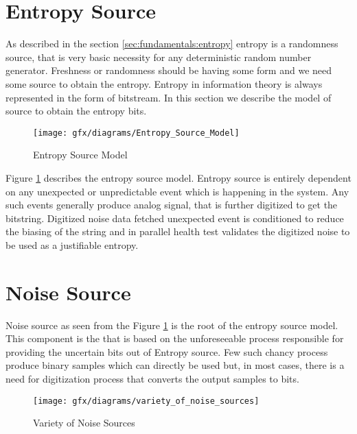 %
%
\section{Entropy Source}
\label{sec:fundamentals:entropysource}
As described in the section \ref{sec:fundamentals:entropy} entropy is a randomness source, that is very basic necessity for any deterministic random number generator. Freshness or randomness should be having some form and we need some source to obtain the entropy. Entropy in information theory is always represented in the form of bitstream. In this section we describe the model of source to obtain the entropy bits.

\begin{figure}[htbp]
	\centering
	\texttt{[image: gfx/diagrams/Entropy\_Source\_Model]}
	\caption{Entropy Source Model}
	\label{fig:2:2}
\end{figure}

Figure \ref{fig:2:2} describes the entropy source model. Entropy source is entirely dependent on any unexpected or unpredictable event which is happening in the system. Any such events generally produce analog signal, that is further digitized to get the bitstring. Digitized noise data fetched unexpected event is conditioned to reduce the biasing of the string and in parallel health test validates the digitized noise to be used as a justifiable entropy.

%
%
\section{Noise Source}
\label{sec:fundamentals:noisesource}
Noise source as seen from the Figure \ref{fig:2:2} is the root of the entropy source model. This component is the that is based on the unforeseeable process responsible for providing the uncertain bits out of Entropy source. Few such chancy process produce binary samples which can directly be used but, in most cases, there is a need for digitization process that converts the output samples to bits.
\begin{figure}[htbp]
	\centering
	\texttt{[image: gfx/diagrams/variety\_of\_noise\_sources]}
	\caption{Variety of Noise Sources}
	\label{fig:2:3}
\end{figure}

